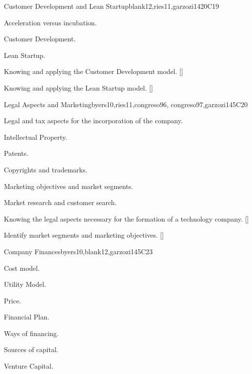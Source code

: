 \begin{syllabus}
   \begin{unit}{}{Customer Development and Lean Startup}{blank12,ries11,garzozi14}{20}{C19}
      \begin{topics}
         \item Acceleration versus incubation.
         \item Customer Development.
         \item Lean Startup.
      \end{topics}
   
      \begin{learningoutcomes} 
         \item Knowing and applying the Customer Development model. [\Usage]
         \item Knowing and applying the Lean Startup model. [\Usage]
       \end{learningoutcomes} 
   \end{unit}
   
   \begin{unit}{}{Legal Aspects and Marketing}{byers10,ries11,congreso96, congreso97,garzozi14}{5}{C20}
      \begin{topics}
         \item Legal and tax aspects for the incorporation of the company.
         \item Intellectual Property.
         \item Patents.
         \item Copyrights and trademarks.
         \item Marketing objectives and market segments.
         \item Market research and customer search.
      \end{topics}
   
     \begin{learningoutcomes} 
         \item Knowing the legal aspects necessary for the formation of a technology company. [\Familiarity]
         \item Identify market segments and marketing objectives. [\Familiarity]
      \end{learningoutcomes} 
   \end{unit}
   
   \begin{unit}{}{Company Finances}{byers10,blank12,garzozi14}{5}{C23}
      \begin{topics}
         \item Cost model.
         \item Utility Model.
         \item Price.
         \item Financial Plan.
         \item Ways of financing.
         \item Sources of capital.
         \item Venture Capital.
      \end{topics}
   

\end{unit}
\end{syllabus}

